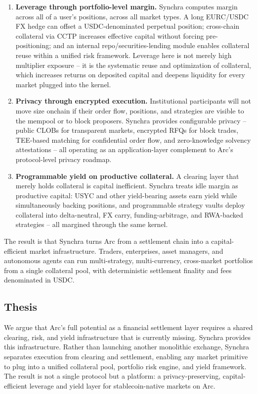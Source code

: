 \documentclass[11pt,a4paper]{article}
\begin{document}
\begin{enumerate}
  \item \textbf{Leverage through portfolio-level margin.} Synchra computes margin across all of a user's positions, across all market types. A long EURC/USDC FX hedge can offset a USDC-denominated perpetual position; cross-chain collateral via CCTP increases effective capital without forcing pre-positioning; and an internal repo/securities-lending module enables collateral reuse within a unified risk framework. Leverage here is not merely high multiplier exposure -- it is the systematic reuse and optimization of collateral, which increases returns on deposited capital and deepens liquidity for every market plugged into the kernel.

  \item \textbf{Privacy through encrypted execution.} Institutional participants will not move size onchain if their order flow, positions, and strategies are visible to the mempool or to block proposers. Synchra provides configurable privacy -- public CLOBs for transparent markets, encrypted RFQs for block trades, TEE-based matching for confidential order flow, and zero-knowledge solvency attestations -- all operating as an application-layer complement to Arc's protocol-level privacy roadmap.

  \item \textbf{Programmable yield on productive collateral.} A clearing layer that merely holds collateral is capital inefficient. Synchra treats idle margin as productive capital: USYC and other yield-bearing assets earn yield while simultaneously backing positions, and programmable strategy vaults deploy collateral into delta-neutral, FX carry, funding-arbitrage, and RWA-backed strategies -- all margined through the same kernel.
\end{enumerate}

The result is that Synchra turns Arc from a settlement chain into a capital-efficient market infrastructure. Traders, enterprises, asset managers, and autonomous agents can run multi-strategy, multi-currency, cross-market portfolios from a single collateral pool, with deterministic settlement finality and fees denominated in USDC.

\subsection{Thesis}

We argue that Arc's full potential as a financial settlement layer requires a shared clearing, risk, and yield infrastructure that is currently missing. Synchra provides this infrastructure. Rather than launching another monolithic exchange, Synchra separates execution from clearing and settlement, enabling any market primitive to plug into a unified collateral pool, portfolio risk engine, and yield framework. The result is not a single protocol but a platform: a privacy-preserving, capital-efficient leverage and yield layer for stablecoin-native markets on Arc.
\end{document}
